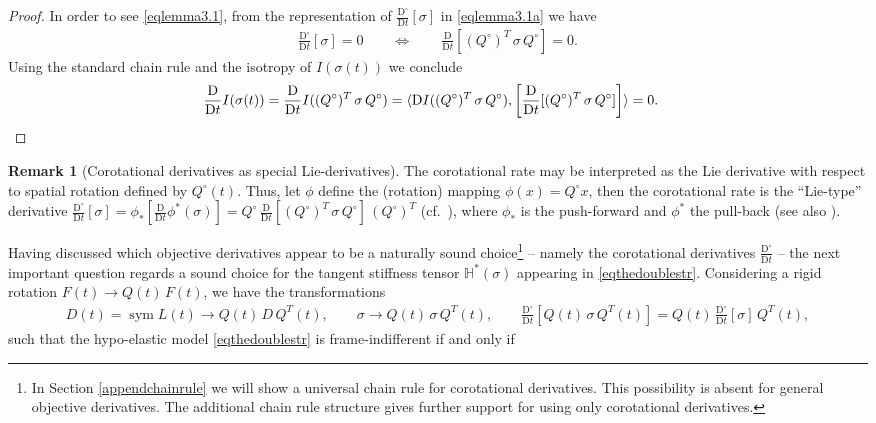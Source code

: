 \documentclass[10pt]{article}
\newcounter{theoremCounter}
\numberwithin{theoremCounter}{section}
\theoremstyle{plain}
\theoremstyle{definition}
\newtheorem{rem}[theoremCounter]{Remark}
\newcommand{\DD}{\mathrm{D}}
\DeclareMathOperator{\sym}{sym}
\def\H{\mathbb{H}}
\numberwithin{equation}{section}
\begin{document}
%
\begin{proof}
In order to see \eqref{eqlemma3.1}, from the representation of $\frac{\DD^{\circ}}{\DD t}[\sigma]$ in \eqref{eqlemma3.1a} we have
	\begin{align}
	\frac{\DD^{\circ}}{\DD t}[\sigma] = 0 \qquad \iff \qquad \frac{\DD}{\DD t}[(Q^{\circ})^T \, \sigma \, Q^{\circ}] = 0.
	\end{align}
Using the standard chain rule and the isotropy of $I(\sigma(t))$ we conclude
	\begin{align}
	\frac{\DD}{\DD t}I(\sigma(t)) &= \frac{\DD}{\DD t}I((Q^{\circ})^T \, \sigma \, Q^{\circ}) = \langle \DD I((Q^{\circ})^T \, \sigma \, Q^{\circ}) ,\left[\frac{\DD}{\DD t}[(Q^{\circ})^T \, \sigma \, Q^{\circ}]\right] \rangle = 0. \qedhere
	\end{align}
\end{proof}
%
\begin{rem}[Corotational derivatives as special Lie-derivatives]
The corotational rate may be interpreted as the Lie derivative with respect to spatial rotation defined by $Q^{\circ}(t)$. Thus, let $\phi$ define the (rotation) mapping $\phi(x) = Q^{\circ}x$, then the corotational rate is the \enquote{Lie-type} derivative $\frac{\DD^{\circ}}{\DD t}[\sigma] = \phi_*[\frac{\DD}{\DD t} \phi^*(\sigma)] = Q^{\circ} \, \frac{\DD}{\DD t}[(Q^{\circ})^T \, \sigma \, Q^{\circ}] \, (Q^{\circ})^T$ (cf.~\cite[p.8]{Norris2008}), where $\phi_*$ is the push-forward and $\phi^*$ the pull-back (see also \cite{holzapfel2000}).
\end{rem}
%
Having discussed which objective derivatives appear to be a naturally sound choice\footnote
{
In Section \ref{appendchainrule} we will show a universal chain rule for corotational derivatives. This possibility is absent for general objective derivatives. The additional chain rule structure gives further support for using only corotational derivatives.
}
-- namely the corotational derivatives $\frac{\DD^{\circ}}{\DD t}$ -- the next important question regards a sound choice for the tangent stiffness tensor $\H^*(\sigma)$ appearing in \eqref{eqthedoublestr}. Considering a rigid rotation $F(t) \to Q(t) \, F(t)$, we have the transformations
	\begin{align}
	D(t) = \sym L(t) \to Q(t) \, D \, Q^T(t), \qquad \sigma \to Q(t) \, \sigma \, Q^T(t), \qquad \frac{\DD^{\circ}}{\DD t}[Q(t) \, \sigma \, Q^T(t)] = Q(t) \, \frac{\DD^{\circ}}{\DD t}[\sigma] \, Q^T(t),
	\end{align}
such that the hypo-elastic model \eqref{eqthedoublestr} is frame-indifferent if and only if
\end{document}
